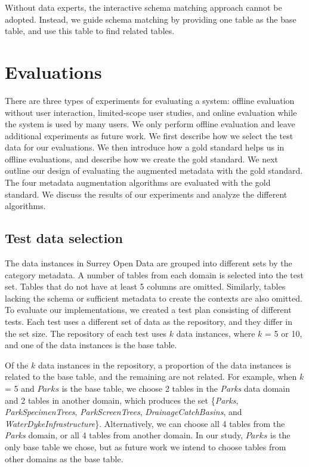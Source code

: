 Without data experts, the interactive schema matching approach cannot be adopted. Instead, we guide schema matching by providing one table as the base table, and use this table to find related tables.

\section{Evaluations}
\label{sec:Evaluations}

There are three types of experiments for evaluating a system: offline evaluation without user interaction, limited-scope user studies, and online evaluation while the system is used by many users. We only perform offline evaluation and leave additional experiments as future work. We first describe how we select the test data for our evaluations. We then introduce how a gold standard helps us in offline evaluations, and describe how we create the gold standard. We next outline our design of evaluating the augmented metadata with the gold standard. The four metadata augmentation algorithms are evaluated with the gold standard. We discuss the results of our experiments and analyze the different algorithms.

\subsection{Test data selection}
\label{ssec:TestDataSelection}

The data instances in Surrey Open Data are grouped into different sets by the category metadata. A number of tables from each domain is selected into the test set. Tables that do not have at least 5 columns are omitted. Similarly, tables lacking the schema or sufficient metadata to create the contexts are also omitted. To evaluate our implementations, we created a test plan consisting of different tests. Each test uses a different set of data as the repository, and they differ in the set size. The repository of each test uses $k$ data instances, where $k$ = 5 or 10, and one of the data instances is the base table.

Of the $k$ data instances in the repository, a proportion of the data instances is related to the base table, and the remaining are not related. For example, when $k$ = 5 and $Parks$ is the base table, we choose 2 tables in the \textit{Parks} data domain and 2 tables in another domain, which produces the set \{\textit{Parks}, \textit{ParkSpecimenTrees}, \textit{ParkScreenTrees}, \textit{DrainageCatchBasins}, and \textit{WaterDykeInfrastructure}\}. Alternatively, we can choose all 4 tables from the \textit{Parks} domain, or all 4 tables from another domain. In our study, $Parks$ is the only base table we chose, but as future work we intend to choose tables from other domains as the base table.


